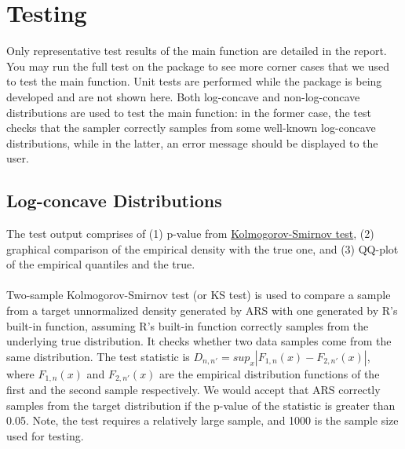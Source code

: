 \documentclass{article}\usepackage[]{graphicx}\usepackage[]{color}
\begin{document}
\section{Testing}
Only representative test results of the main function are detailed in the report.
You may run the full test on the package to see more corner cases that we used to
test the main function.
Unit tests are performed while the package is being developed and are not shown here. 
Both log-concave and non-log-concave distributions are used to test the main function: 
in the former case, the test checks that the sampler correctly samples from some 
well-known log-concave distributions, while in the latter,
an error message should be displayed to the user.\\
\subsection{Log-concave Distributions}
The test output comprises of (1) p-value from 
\href{https://en.wikipedia.org/wiki/Kolmogorov\%E2\%80\%93Smirnov_test}{Kolmogorov-Smirnov test}, 
(2) graphical comparison of the empirical density with the true one,
and (3) QQ-plot of the empirical quantiles and the true.\\
\\
Two-sample Kolmogorov-Smirnov test (or KS test) is used to compare a sample from 
a target unnormalized density generated by ARS with one generated by R's built-in 
function, assuming R's built-in function correctly samples from the underlying true
distribution. It checks whether two data samples come from the same distribution. The
test statistic is $D_{n, n'} = sup_x|F_{1,n}(x) - F_{2,n'}(x)|$, where
$F_{1,n}(x)$ and $F_{2,n'}(x)$ are  the empirical distribution functions of the 
first and the second sample respectively. We would accept that ARS correctly samples
from the target distribution if the p-value of the statistic is greater than 0.05.
Note, the test requires a relatively large sample, and 1000 is the sample
size used for testing.
\end{document}

